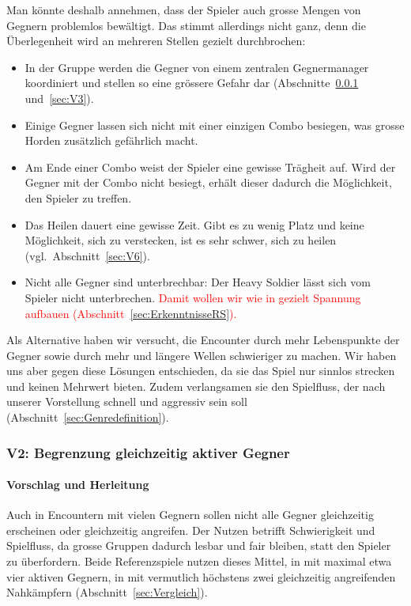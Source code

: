 \documentclass[../Main.tex]{subfiles}
\begin{document}
Man könnte deshalb annehmen, dass der Spieler auch grosse Mengen von Gegnern problemlos bewältigt. Das stimmt allerdings nicht ganz, denn die Überlegenheit wird an mehreren Stellen gezielt durchbrochen:

\begin{itemize}[leftmargin=1.5cm]
    \item In der Gruppe werden die Gegner von einem zentralen Gegnermanager koordiniert und stellen so eine grössere Gefahr dar (Abschnitte~\ref{sec:V2} und~\ref{sec:V3}).
    \item Einige Gegner lassen sich nicht mit einer einzigen Combo besiegen, was grosse Horden zusätzlich gefährlich macht.
    \item Am Ende einer Combo weist der Spieler eine gewisse Trägheit auf. Wird der Gegner mit der Combo nicht besiegt, erhält dieser dadurch die Möglichkeit, den Spieler zu treffen.
    \item Das Heilen dauert eine gewisse Zeit. Gibt es zu wenig Platz und keine Möglichkeit, sich zu verstecken, ist es sehr schwer, sich zu heilen (vgl.~Abschnitt~\ref{sec:V6}).
    \item Nicht alle Gegner sind unterbrechbar: Der Heavy Soldier lässt sich vom Spieler nicht unterbrechen. \textcolor{red}{Damit wollen wir wie in  gezielt Spannung aufbauen (Abschnitt~\ref{sec:ErkenntnisseRS}).}
\end{itemize}

Als Alternative haben wir versucht, die Encounter durch mehr Lebenspunkte der Gegner sowie durch mehr und längere Wellen schwieriger zu machen. Wir haben uns aber gegen diese Lösungen entschieden, da sie das Spiel nur sinnlos strecken und keinen Mehrwert bieten. Zudem verlangsamen sie den Spielfluss, der nach unserer Vorstellung schnell und aggressiv sein soll (Abschnitt~\ref{sec:Genredefinition}).

\subsubsection{V2: Begrenzung gleichzeitig aktiver Gegner} \label{sec:V2}

\paragraph{Vorschlag und Herleitung}
Auch in Encountern mit vielen Gegnern sollen nicht alle Gegner gleichzeitig erscheinen oder gleichzeitig angreifen. Der Nutzen betrifft Schwierigkeit und Spielfluss, da grosse Gruppen dadurch lesbar und fair bleiben, statt den Spieler zu überfordern. Beide Referenzspiele nutzen dieses Mittel, in  mit maximal etwa vier aktiven Gegnern, in  mit vermutlich höchstens zwei gleichzeitig angreifenden Nahkämpfern (Abschnitt~\ref{sec:Vergleich}).
\end{document}
